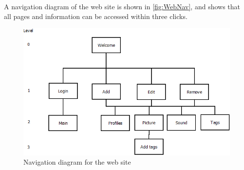 A navigation diagram of the web site is shown in \autoref{fig:WebNav}, and shows that all pages and information can be accessed within three clicks.

\begin{figure}
	\centering
		\includegraphics[width=1.00\textwidth]{images/WebNav.png}
	\caption{Navigation diagram for the web site}
	\label{fig:WebNav}
\end{figure}
